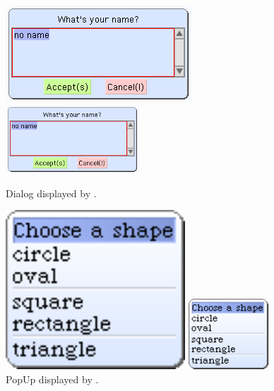 \documentclass[a4paper,10pt,twoside]{book}
\begin{document}
\begin{figure}[htb]
\begin{minipage}{0.48\textwidth}
	\ifluluelse
		{\centerline{\includegraphics[width=\textwidth]{dialog}}}
		{\centerline{\includegraphics[width=5cm]{dialog}}}
	\caption{Dialog displayed by .
		\label{fig:dialogName}}
\end{minipage}
\hfill
\begin{minipage}{0.48\textwidth}
	\ifluluelse
		{\centerline{\includegraphics [width=0.6\textwidth]{popup}}}
		{\centerline{\includegraphics[width=3cm]{popup}}}
	\caption{PopUp displayed by .}
\end{minipage}
\end{figure}
\end{document}
